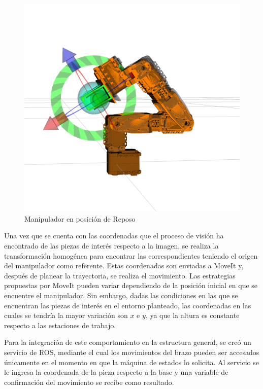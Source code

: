 \begin{figure}[H]
    \centering
    \includegraphics[scale=0.25]{Figures/Arm_RestPos.png}
        \caption{Manipulador en posición de Reposo}
        \label{fig:Arm_ResPos}
\end{figure}

Una vez que se cuenta con las coordenadas que el proceso de visión ha encontrado de las piezas de interés respecto a la imagen, se realiza la transformación homogénea para encontrar las correspondientes teniendo el origen del manipulador como referente. Estas coordenadas son enviadas a MoveIt y, después de planear la trayectoria, se realiza el movimiento. Las estrategias propuestas por MoveIt pueden variar dependiendo de la posición inicial en que se encuentre el manipulador. Sin embargo, dadas las condiciones en las que se encuentran las piezas de interés en el entorno planteado, las coordenadas en las cuales se tendría la mayor variación son $x$ e $y$, ya que la altura es constante respecto a las estaciones de trabajo. 

Para la integración de este comportamiento en la estructura general, se creó un servicio de ROS, mediante el cual los movimientos del brazo pueden ser accesados únicamente en el momento en que la máquina de estados lo solicita. Al servicio se le ingresa la coordenada de la pieza respecto a la base y una variable de confirmación del movimiento se recibe como resultado. 

